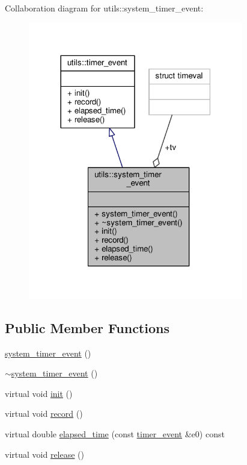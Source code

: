 Collaboration diagram for utils\-:\-:system\-\_\-timer\-\_\-event\-:
\nopagebreak
\begin{figure}[H]
\begin{center}
\leavevmode
\includegraphics[width=266pt]{structutils_1_1system__timer__event__coll__graph}
\end{center}
\end{figure}
\subsection*{Public Member Functions}
\begin{DoxyCompactItemize}
\item 
\hyperlink{structutils_1_1system__timer__event_a1920c1d39f2cdd3f906136ca1078a5e0}{system\-\_\-timer\-\_\-event} ()
\item 
\hyperlink{structutils_1_1system__timer__event_aac8289d13234a88148486ef7cd79045d}{$\sim$system\-\_\-timer\-\_\-event} ()
\item 
virtual void \hyperlink{structutils_1_1system__timer__event_a71f9a9e0ff689a510ed2f1035a5b39ec}{init} ()
\item 
virtual void \hyperlink{structutils_1_1system__timer__event_acedb8d5acbeb6e11366aa8253b3f00b7}{record} ()
\item 
virtual double \hyperlink{structutils_1_1system__timer__event_a9d0cc042f07a406cb43946aec96ba470}{elapsed\-\_\-time} (const \hyperlink{structutils_1_1timer__event}{timer\-\_\-event} \&e0) const 
\item 
virtual void \hyperlink{structutils_1_1system__timer__event_a544e19f0a36e569d959d5c092050383b}{release} ()
\end{DoxyCompactItemize}
